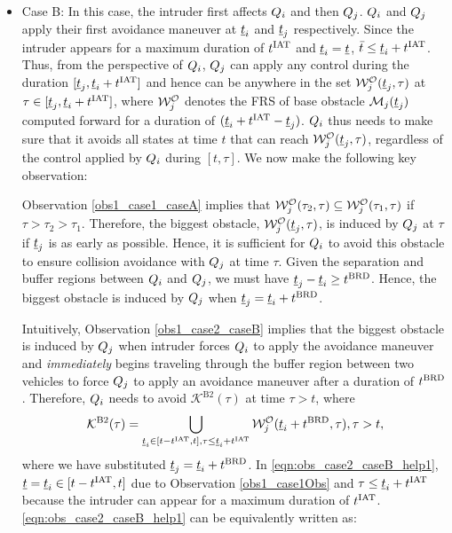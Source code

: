 \begin{itemize}[leftmargin=*]
\item \label{sec:intruderObs_case2_caseB} Case B: In this case, the intruder first affects $Q_i$ and then $Q_j$. $Q_i$ and $Q_j$ apply their first avoidance maneuver at $\underline{t}_i$ and $\underline{t}_j$ respectively. Since the intruder appears for a maximum duration of $t^\text{IAT}$ and $\underline{t}_i = \underline{t}$, $\bar{t} \leq \underline{t}_i + t^\text{IAT}$. Thus, from the perspective  of $Q_i$, $Q_j$ can apply any control during the duration $[\underline{t}_j, \underline{t}_i + t^\text{IAT}]$ and hence can be anywhere in the set $\mathcal{W}_{j}^{\mathcal{O}}(\underline{t}_j, \tau)$ at $\tau \in [\underline{t}_j, \underline{t}_i + t^\text{IAT}]$, where $\mathcal{W}_{j}^{\mathcal{O}}$ denotes the FRS of base obstacle $\mathcal{M}_j(\underline{t}_j)$ computed forward for a duration of $(\underline{t}_i + t^\text{IAT} - \underline{t}_j)$. $Q_i$ thus needs to make sure that it avoids all states at time $t$ that can reach $\mathcal{W}_{j}^{\mathcal{O}}(\underline{t}_j, \tau)$, regardless of the control applied by $Q_i$ during $[t, \tau]$. We now make the following key observation:
\begin{observation} \label{obs1_case2_caseB}
Observation \ref{obs1_case1_caseA} implies that $\mathcal{W}_{j}^{\mathcal{O}}(\tau_2, \tau) \subseteq \mathcal{W}_{j}^{\mathcal{O}}(\tau_1, \tau)$ if $\tau > \tau_2 > \tau_1$. Therefore, the biggest obstacle, $\mathcal{W}_{j}^{\mathcal{O}}(\underline{t}_j, \tau)$, is induced by $Q_j$ at $\tau$ if $\underline{t}_j$ is as early as possible. Hence, it is sufficient for $Q_i$ to avoid this obstacle to ensure collision avoidance with $Q_j$ at time $\tau$. Given the separation and buffer regions between $Q_i$ and $Q_j$, we must have $\underline{t}_j - \underline{t}_i \geq t^\text{BRD}$. Hence, the biggest obstacle is induced by $Q_j$ when $\underline{t}_j = \underline{t}_i + t^\text{BRD}$. 
\end{observation}
Intuitively, Observation \ref{obs1_case2_caseB} implies that the biggest obstacle is induced by $Q_j$ when intruder forces $Q_i$ to apply the avoidance maneuver and \textit{immediately} begins traveling through the buffer region between two vehicles to force $Q_j$ to apply an avoidance maneuver after a duration of $t^\text{BRD}$. Therefore, $Q_i$ needs to avoid $\mathcal{K}^{\text{B2}}(\tau)$ at time $\tau > t$, where 
\begin{equation} \label{eqn:obs_case2_caseB_help1}
\mathcal{K}^{\text{B2}}(\tau) =  \bigcup_{\tsa_i \in [t-\iat, t], \tau \leq \tsa_i + \iat} \frs_{j}^{\mathcal{O}}(\tsa_i + \brd, \tau), \tau>t,
\end{equation}
where we have substituted $\underline{t}_j = \underline{t}_i + t^\text{BRD}$. In \eqref{eqn:obs_case2_caseB_help1}, $\underline{t} = \underline{t}_i \in [t-t^\text{IAT}, t]$ due to Observation \ref{obs1_case1Obs} and $\tau \leq \underline{t}_i + t^\text{IAT}$ because the intruder can appear for a maximum duration of $t^\text{IAT}$. \eqref{eqn:obs_case2_caseB_help1} can be equivalently written as:  

\end{itemize}
